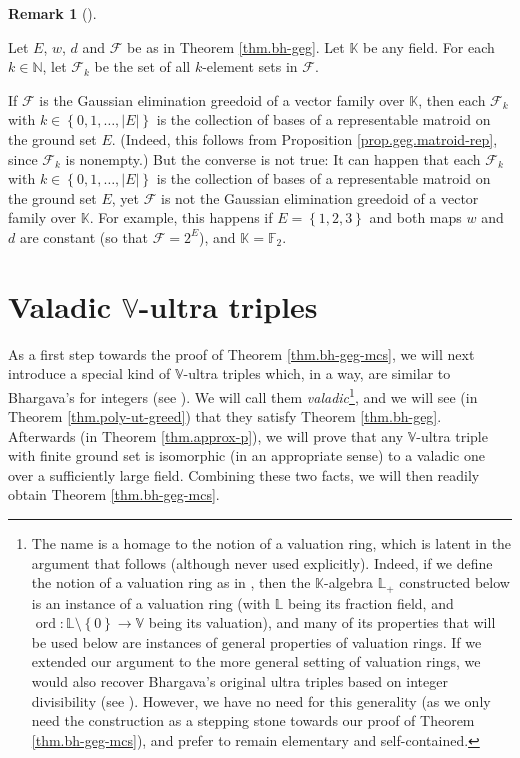 \documentclass[numbers=enddot,12pt,final,onecolumn,notitlepage]{scrartcl}%
\theoremstyle{definition}
\newtheorem{remk}[theo]{Remark}
\newenvironment{remark}[1][]
{\begin{remk}[#1]\begin{leftbar}}
{\end{leftbar}\end{remk}}
\theoremstyle{plainsl}
\begin{document}
\begin{remark}
Let $E$, $w$, $d$ and $\mathcal{F}$ be as in Theorem \ref{thm.bh-geg}. Let
$\mathbb{K}$ be any field. For each $k\in\mathbb{N}$, let $\mathcal{F}_{k}$ be
the set of all $k$-element sets in $\mathcal{F}$.

If $\mathcal{F}$ is the Gaussian elimination greedoid of a vector family over
$\mathbb{K}$, then each $\mathcal{F}_{k}$ with $k\in\left\{  0,1,\ldots
,\left\vert E\right\vert \right\}  $ is the collection of bases of a
representable matroid on the ground set $E$. (Indeed, this follows from
Proposition \ref{prop.geg.matroid-rep}, since $\mathcal{F}_{k}$ is nonempty.)
But the converse is not true: It can happen that each $\mathcal{F}_{k}$ with
$k\in\left\{  0,1,\ldots,\left\vert E\right\vert \right\}  $ is the collection
of bases of a representable matroid on the ground set $E$, yet $\mathcal{F}$
is not the Gaussian elimination greedoid of a vector family over $\mathbb{K}$.
For example, this happens if $E=\left\{  1,2,3\right\}  $ and both maps $w$
and $d$ are constant (so that $\mathcal{F}=2^{E}$), and $\mathbb{K}%
=\mathbb{F}_{2}$.
\end{remark}

\section{\label{sect.p-adic}Valadic $\mathbb{V}$-ultra triples}

As a first step towards the proof of Theorem \ref{thm.bh-geg-mcs}, we will
next introduce a special kind of $\mathbb{V}$-ultra triples which, in a way,
are similar to Bhargava's for integers (see \cite[Example 2.5 and
\S 9]{GriPet19}). We will call them \textit{valadic}\footnote{The name is a
homage to the notion of a valuation ring, which is latent in the argument that
follows (although never used explicitly). Indeed, if we define the notion of a
valuation ring as in \cite[Exercise 11.1]{Eisenb95}, then the $\mathbb{K}%
$-algebra $\mathbb{L}_{+}$ constructed below is an instance of a valuation
ring (with $\mathbb{L}$ being its fraction field, and $\operatorname*{ord}%
:\mathbb{L}\setminus\left\{  0\right\}  \rightarrow\mathbb{V}$ being its
valuation), and many of its properties that will be used below are instances
of general properties of valuation rings. If we extended our argument to the
more general setting of valuation rings, we would also recover Bhargava's
original ultra triples based on integer divisibility (see \cite[Example 2.5
and \S 9]{GriPet19}). However, we have no need for this generality (as we only
need the construction as a stepping stone towards our proof of Theorem
\ref{thm.bh-geg-mcs}), and prefer to remain elementary and self-contained.},
and we will see (in Theorem \ref{thm.poly-ut-greed}) that they satisfy Theorem
\ref{thm.bh-geg}. Afterwards (in Theorem \ref{thm.approx-p}), we will prove
that any $\mathbb{V}$-ultra triple with finite ground set is isomorphic (in an
appropriate sense) to a valadic one over a sufficiently large field. Combining
these two facts, we will then readily obtain Theorem \ref{thm.bh-geg-mcs}.
\end{document}
